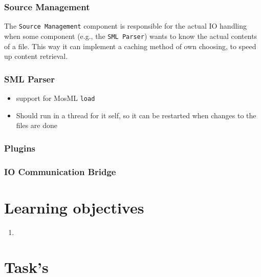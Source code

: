 \documentclass[a4paper,oneside]{memoir}
\begin{document}
\subsubsection{Source Management}


The \texttt{Source Management} component is responsible for the actual IO handling when
some component (e.g., the \texttt{SML Parser}) wants to know the actual contents
of a file. This way it can implement a caching method of own choosing, to speed
up content retrieval.




\subsubsection{SML Parser}
\begin{itemize}
\item support for MosML \texttt{load}

\item Should run in a thread for it self, so it can be restarted when
  changes to the files are done
\end{itemize}

\subsubsection{Plugins}


\subsubsection{IO Communication Bridge}



\section{Learning objectives}

\begin{enumerate}
\item
\end{enumerate}


\section{Task's}
\end{document}
